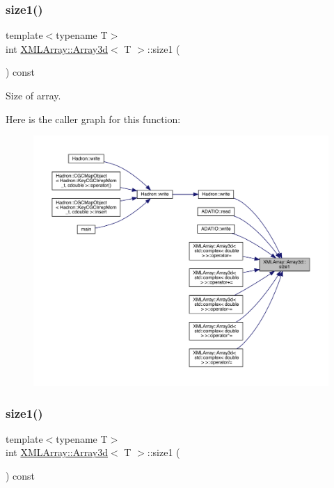 \subsubsection{\texorpdfstring{size1()}{size1()}\hspace{0.1cm}{\footnotesize\ttfamily [1/3]}}
{\footnotesize\ttfamily template$<$typename T$>$ \\
int \mbox{\hyperlink{classXMLArray_1_1Array3d}{X\+M\+L\+Array\+::\+Array3d}}$<$ T $>$\+::size1 (\begin{DoxyParamCaption}{ }\end{DoxyParamCaption}) const\hspace{0.3cm}{\ttfamily [inline]}}



Size of array. 

Here is the caller graph for this function\+:
\nopagebreak
\begin{figure}[H]
\begin{center}
\leavevmode
\includegraphics[width=350pt]{db/da0/classXMLArray_1_1Array3d_aa084cbb2756e62556c9ec4c4cb971bf0_icgraph}
\end{center}
\end{figure}
\mbox{\label{classXMLArray_1_1Array3d_aa084cbb2756e62556c9ec4c4cb971bf0}} 
\subsubsection{\texorpdfstring{size1()}{size1()}\hspace{0.1cm}{\footnotesize\ttfamily [2/3]}}
{\footnotesize\ttfamily template$<$typename T$>$ \\
int \mbox{\hyperlink{classXMLArray_1_1Array3d}{X\+M\+L\+Array\+::\+Array3d}}$<$ T $>$\+::size1 (\begin{DoxyParamCaption}{ }\end{DoxyParamCaption}) const\hspace{0.3cm}{\ttfamily [inline]}}




